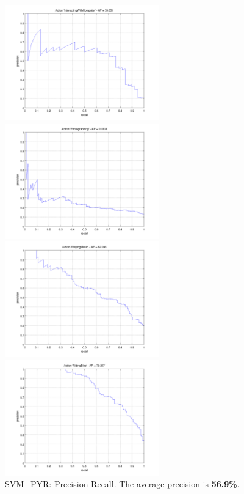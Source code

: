 \documentclass[10pt,a4paper]{llncs}
\begin{document}
\begin{figure}
\caption{SVM+PYR: Precision-Recall. The average precision is \textbf{56.9\%}.}
\label{fig:SVM_PYR_PR}
\begin{minipage}{0.5\linewidth}
\includegraphics[height=5cm]{img/SVM_PYR_PR_InteractingWithComputer.png}
\end{minipage}
\begin{minipage}{0.5\linewidth}
\includegraphics[height=5cm]{img/SVM_PYR_PR_Photographing.png}
\end{minipage}
\begin{minipage}{0.5\linewidth}
\includegraphics[height=5cm]{img/SVM_PYR_PR_PlayingMusic.png}
\end{minipage}
\begin{minipage}{0.5\linewidth}
\includegraphics[height=5cm]{img/SVM_PYR_PR_RidingBike.png}

\end{minipage}
\end{figure}
\end{document}
